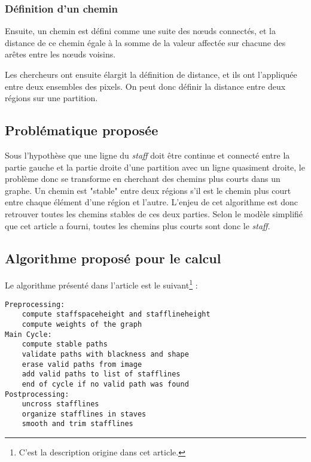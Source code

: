 \documentclass{article}
\begin{document}
\subsubsection{Définition d'un chemin}
\par Ensuite, un chemin est défini comme une suite des nœuds connectés, et la distance de ce chemin égale à la somme de la valeur affectée sur chacune des arêtes entre les nœuds voisins.
\par Les chercheurs ont ensuite élargit la définition de distance, et ils ont l'appliquée entre deux ensembles des pixels. On peut donc définir la distance entre deux régions sur une partition. 

\subsection{Problématique proposée}
\par Sous l'hypothèse que une ligne du \textit{staff} doit être continue et connecté entre la partie gauche et la partie droite d'une partition avec un ligne quasiment droite, le problème donc se transforme en cherchant des chemins plus courts dans un graphe. Un chemin est "stable" entre deux régions s'il est le chemin plus court entre chaque élément d'une région et l'autre. L'enjeu de cet algorithme est donc retrouver toutes les chemins stables de ces deux parties. Selon le modèle simplifié que cet article a fourni, toutes les chemins plus courts sont donc le \textit{staff}.

\subsection{Algorithme proposé pour le calcul}
\par Le algorithme présenté dans l'article est le suivant\footnote{C'est la description origine dans cet article.} :
\begin{verbatim}
Preprocessing:
    compute staffspaceheight and stafflineheight
    compute weights of the graph
Main Cycle:
    compute stable paths
    validate paths with blackness and shape
    erase valid paths from image
    add valid paths to list of stafflines
    end of cycle if no valid path was found
Postprocessing:
    uncross stafflines
    organize stafflines in staves
    smooth and trim stafflines
\end{verbatim}
\end{document}
